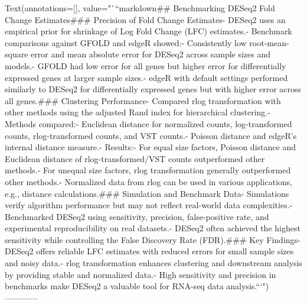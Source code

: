 Text(annotations=[], value="```markdown\n## Benchmarking DESeq2 Fold Change Estimates\n\n### Precision of Fold Change Estimates\n\n- DESeq2 uses an empirical prior for shrinkage of Log Fold Change (LFC) estimates.\n- Benchmark comparisons against GFOLD and edgeR showed:\n  - Consistently low root-mean-square error and mean absolute error for DESeq2 across sample sizes and models.\n  - GFOLD had low error for all genes but higher error for differentially expressed genes at larger sample sizes.\n  - edgeR with default settings performed similarly to DESeq2 for differentially expressed genes but with higher error across all genes.\n\n### Clustering Performance\n\n- Compared rlog transformation with other methods using the adjusted Rand index for hierarchical clustering.\n- Methods compared:\n  - Euclidean distance for normalized counts, log-transformed counts, rlog-transformed counts, and VST counts.\n  - Poisson distance and edgeR's internal distance measure.\n- Results:\n  - For equal size factors, Poisson distance and Euclidean distance of rlog-transformed/VST counts outperformed other methods.\n  - For unequal size factors, rlog transformation generally outperformed other methods.\n- Normalized data from rlog can be used in various applications, e.g., distance calculations.\n\n### Simulation and Benchmark Data\n\n- Simulations verify algorithm performance but may not reflect real-world data complexities.\n- Benchmarked DESeq2 using sensitivity, precision, false-positive rate, and experimental reproducibility on real datasets.\n- DESeq2 often achieved the highest sensitivity while controlling the False Discovery Rate (FDR).\n\n### Key Findings\n\n- DESeq2 offers reliable LFC estimates with reduced errors for small sample sizes and noisy data.\n- rlog transformation enhances clustering and downstream analysis by providing stable and normalized data.\n- High sensitivity and precision in benchmarks make DESeq2 a valuable tool for RNA-seq data analysis.\n\n```\n")
------------
